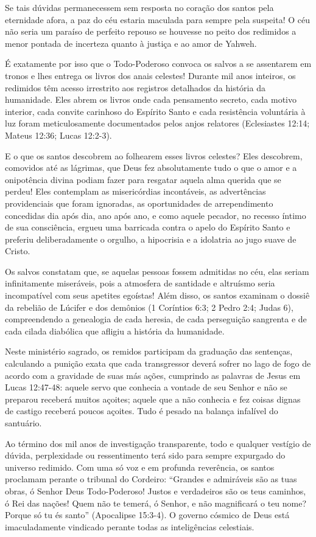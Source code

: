 \documentclass[11pt,a4paper,openany]{book}
\begin{document}
Se tais dúvidas permanecessem sem resposta no coração dos santos pela eternidade afora, a paz do céu estaria maculada para sempre pela suspeita! O céu não seria um paraíso de perfeito repouso se houvesse no peito dos redimidos a menor pontada de incerteza quanto à justiça e ao amor de Yahweh.

É exatamente por isso que o Todo-Poderoso convoca os salvos a se assentarem em tronos e lhes entrega os livros dos anais celestes! Durante mil anos inteiros, os redimidos têm acesso irrestrito aos registros detalhados da história da humanidade. Eles abrem os livros onde cada pensamento secreto, cada motivo interior, cada convite carinhoso do Espírito Santo e cada resistência voluntária à luz foram meticulosamente documentados pelos anjos relatores (Eclesiastes 12:14; Mateus 12:36; Lucas 12:2-3).

E o que os santos descobrem ao folhearem esses livros celestes?
Eles descobrem, comovidos até as lágrimas, que Deus fez absolutamente tudo o que o amor e a onipotência divina podiam fazer para resgatar aquela alma querida que se perdeu! Eles contemplam as misericórdias incontáveis, as advertências providenciais que foram ignoradas, as oportunidades de arrependimento concedidas dia após dia, ano após ano, e como aquele pecador, no recesso íntimo de sua consciência, ergueu uma barricada contra o apelo do Espírito Santo e preferiu deliberadamente o orgulho, a hipocrisia e a idolatria ao jugo suave de Cristo.

Os salvos constatam que, se aquelas pessoas fossem admitidas no céu, elas seriam infinitamente miseráveis, pois a atmosfera de santidade e altruísmo seria incompatível com seus apetites egoístas!
Além disso, os santos examinam o dossiê da rebelião de Lúcifer e dos demônios (1 Coríntios 6:3; 2 Pedro 2:4; Judas 6), compreendendo a genealogia de cada heresia, de cada perseguição sangrenta e de cada cilada diabólica que afligiu a história da humanidade.

Neste ministério sagrado, os remidos participam da graduação das sentenças, calculando a punição exata que cada transgressor deverá sofrer no lago de fogo de acordo com a gravidade de suas más ações, cumprindo as palavras de Jesus em Lucas 12:47-48: aquele servo que conhecia a vontade de seu Senhor e não se preparou receberá muitos açoites; aquele que a não conhecia e fez coisas dignas de castigo receberá poucos açoites. Tudo é pesado na balança infalível do santuário.

Ao término dos mil anos de investigação transparente, todo e qualquer vestígio de dúvida, perplexidade ou ressentimento terá sido para sempre expurgado do universo redimido. Com uma só voz e em profunda reverência, os santos proclamam perante o tribunal do Cordeiro: ``Grandes e admiráveis são as tuas obras, ó Senhor Deus Todo-Poderoso! Justos e verdadeiros são os teus caminhos, ó Rei das nações! Quem não te temerá, ó Senhor, e não magnificará o teu nome? Porque só tu és santo'' (Apocalipse 15:3-4). O governo cósmico de Deus está imaculadamente vindicado perante todas as inteligências celestiais.
\end{document}

